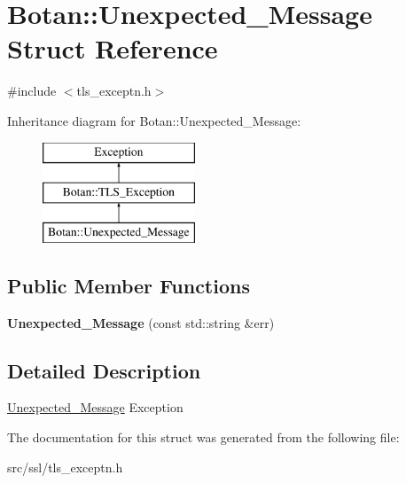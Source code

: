 \hypertarget{structBotan_1_1Unexpected__Message}{\section{Botan\-:\-:Unexpected\-\_\-\-Message Struct Reference}
\label{structBotan_1_1Unexpected__Message}
}


{\ttfamily \#include $<$tls\-\_\-exceptn.\-h$>$}

Inheritance diagram for Botan\-:\-:Unexpected\-\_\-\-Message\-:\begin{figure}[H]
\begin{center}
\leavevmode
\includegraphics[height=3.000000cm]{structBotan_1_1Unexpected__Message}
\end{center}
\end{figure}
\subsection*{Public Member Functions}
\begin{DoxyCompactItemize}
\item 
\hypertarget{structBotan_1_1Unexpected__Message_a18028492893b4d7037fc648143f8bf31}{{\bfseries Unexpected\-\_\-\-Message} (const std\-::string \&err)}\label{structBotan_1_1Unexpected__Message_a18028492893b4d7037fc648143f8bf31}

\end{DoxyCompactItemize}


\subsection{Detailed Description}
\hyperlink{structBotan_1_1Unexpected__Message}{Unexpected\-\_\-\-Message} Exception 

The documentation for this struct was generated from the following file\-:\begin{DoxyCompactItemize}
\item 
src/ssl/tls\-\_\-exceptn.\-h\end{DoxyCompactItemize}
